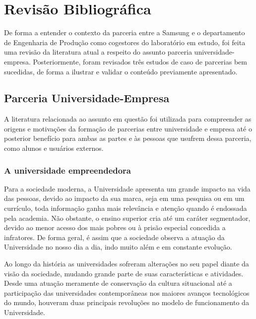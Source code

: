 \chapter[Revisão Bibliográfica]{Revisão Bibliográfica}
\label{chap:revisao}

De forma a entender o contexto da parceria entre a Samsung e o departamento de Engenharia de Produção como cogestores do laboratório em estudo, foi feita uma revisão da literatura atual a respeito do assunto parceria universidade-empresa. Posteriormente, foram revisados três estudos de caso de parcerias bem sucedidas, de forma a ilustrar e validar o conteúdo previamente apresentado.

\section{Parceria Universidade-Empresa}
\label{cha:ensino}

A literatura relacionada ao assunto em questão foi utilizada para compreender as origens e motivações da formação de parcerias entre universidade e empresa até o posterior benefício para ambas as partes e às pessoas que usufrem dessa parceria, como alunos e usuários externos.

\subsection{A universidade empreendedora}
\label{cha:univ_empreend}

Para a sociedade moderna, a Universidade apresenta um grande impacto na vida das pessoas, devido ao impacto da sua marca, seja em uma pesquisa ou em um currículo, toda informação ganha mais relevância e atenção quando é endossada pela academia. Não obstante, o ensino superior cria até um caráter segmentador, devido ao menor acesso dos mais pobres ou à prisão especial concedida a infratores. De forma geral, é assim que a sociedade observa a atuação da Universidade no nosso dia a dia, indo muito além e em constante evolução.

Ao longo da história as universidades sofreram alterações no seu papel diante da visão da sociedade, mudando grande parte de suas características e atividades. Desde uma atuação meramente de conservação da cultura situacional até a participação das universidades contemporâneas nos maiores avanços tecnológicos do mundo, houveram duas principais revoluções no modelo de funcionamento da Universidade. \cite{etzkowitz2001}

